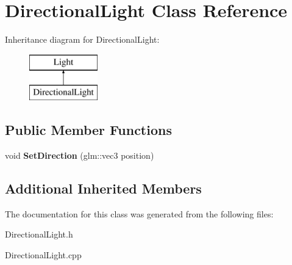 \hypertarget{class_directional_light}{}\section{Directional\+Light Class Reference}
\label{class_directional_light}
Inheritance diagram for Directional\+Light\+:\begin{figure}[H]
\begin{center}
\leavevmode
\includegraphics[height=2.000000cm]{class_directional_light}
\end{center}
\end{figure}
\subsection*{Public Member Functions}
\begin{DoxyCompactItemize}
\item 
\hypertarget{class_directional_light_afdd5ff26965bdc32a0254af59332afd5}{}void {\bfseries Set\+Direction} (glm\+::vec3 position)\label{class_directional_light_afdd5ff26965bdc32a0254af59332afd5}

\end{DoxyCompactItemize}
\subsection*{Additional Inherited Members}


The documentation for this class was generated from the following files\+:\begin{DoxyCompactItemize}
\item 
Directional\+Light.\+h\item 
Directional\+Light.\+cpp\end{DoxyCompactItemize}
